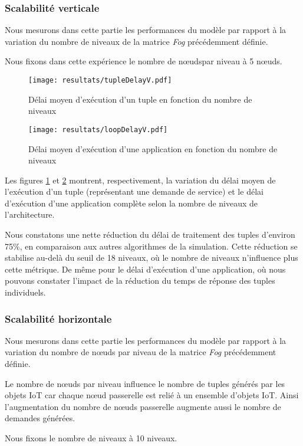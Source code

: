 \subsubsection{Scalabilité verticale}
Nous mesurons dans cette partie les performances du modèle par rapport à la variation du nombre de niveaux de la matrice \emph{Fog} précédemment définie.\par
Nous fixons dans cette expérience le nombre de nœudspar niveau à 5 nœuds.

\begin{figure}[H]
  \centering
  \texttt{[image: resultats/tupleDelayV.pdf]}
  \caption{Délai moyen d'exécution d'un tuple en fonction du nombre de niveaux}
  \label{fig:delai_tuple_vertical}
\end{figure}

\begin{figure}[H]
  \centering
  \texttt{[image: resultats/loopDelayV.pdf]}
  \caption{Délai moyen d'exécution d'une application en fonction du nombre de niveaux}
  \label{fig:delai_application_vertical}
\end{figure}

Les figures \ref{fig:delai_tuple_vertical} et \ref{fig:delai_application_vertical} montrent, respectivement, la variation du délai moyen de l'exécution d'un tuple (représentant une demande de service) et le délai d'exécution d'une application complète selon la nombre de niveaux de l'architecture.\par
Nous constatons une nette réduction du délai de traitement des tuples d'environ 75\%, en comparaison aux autres algorithmes de la simulation. Cette réduction se stabilise au-delà du seuil de 18 niveaux, où le nombre de niveaux n'influence plus cette métrique. De même pour le délai d'exécution d'une application, où nous pouvons constater l'impact de la réduction du temps de réponse des tuples individuels.

\subsubsection{Scalabilité horizontale}
Nous mesurons dans cette partie les performances du modèle par rapport à la variation du nombre de nœuds par niveau de la matrice \emph{Fog} précédemment définie.\par
Le nombre de nœuds par niveau influence le nombre de tuples générés par les objets IoT car chaque nœud passerelle est relié à un ensemble d’objets IoT. Ainsi l’augmentation du nombre de nœuds passerelle augmente aussi le nombre de demandes générées.\par
Nous fixons le nombre de niveaux à 10 niveaux.

